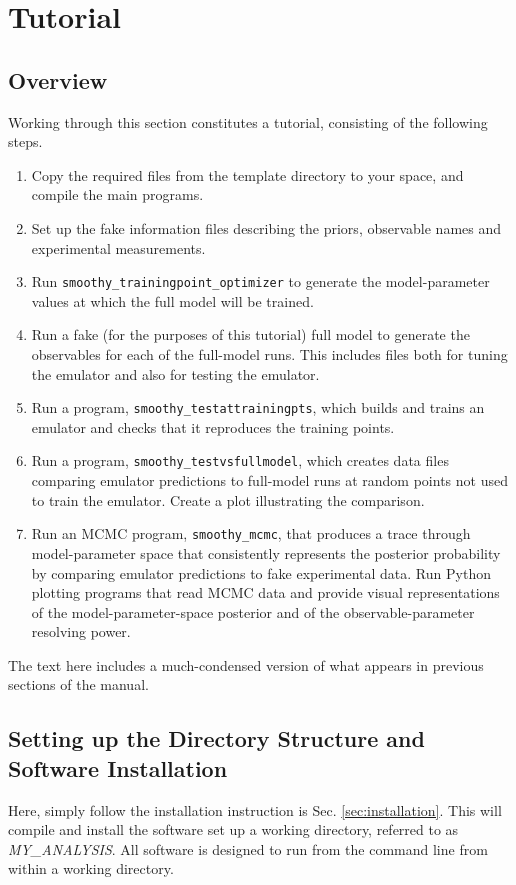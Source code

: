 \documentclass[UserManual.tex]{subfiles}
\begin{document}
\begin{sloppypar}
\section{Tutorial}\label{sec:tutorial}

\subsection{Overview}

Working through this section constitutes a tutorial, consisting of the following steps.
\begin{enumerate}[label=\arabic*.]\itemsep=0pt
\item Copy the required files from the template directory to your space, and compile the main programs.
\item Set up the fake information files describing the priors, observable names and experimental measurements.
\item Run {\tt smoothy\_trainingpoint\_optimizer} to generate the model-parameter values at which the full model will be trained.
\item Run a fake (for the purposes of this tutorial) full model to generate the observables for each of the full-model runs. This includes files both for tuning the emulator and also for testing the emulator.
\item Run a program, {\tt smoothy\_testattrainingpts}, which builds and trains an emulator and checks that it reproduces the training points.
\item Run a program, {\tt smoothy\_testvsfullmodel}, which creates data files comparing emulator predictions to full-model runs at random points not used to train the emulator. Create a plot illustrating the comparison.
\item Run an MCMC program, {\tt smoothy\_mcmc}, that produces a trace through model-parameter space that consistently represents the posterior probability by comparing emulator predictions to fake experimental data. Run Python plotting programs that read MCMC data and provide visual representations of the model-parameter-space posterior and of the observable-parameter resolving power.
\end{enumerate}
The text here includes a much-condensed version of what appears in previous sections of the manual.

\subsection{Setting up the Directory Structure and Software Installation}
Here, simply follow the installation instruction is Sec. \ref{sec:installation}. This will compile and install the software set up a working directory, referred to as \textit{MY\_ANALYSIS}. All software is designed to run from the command line from within a working directory.


\end{sloppypar}
\end{document}
